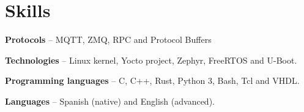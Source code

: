 \section{Skills}
\begin{small}
	\parbox[t][][t]{\linewidth}{
		\textbf{Protocols} -- {MQTT, ZMQ, RPC and Protocol Buffers}
		\bigbreak
	}
	\parbox[t][][t]{\linewidth}{
		\textbf{Technologies} -- {Linux kernel, Yocto project, Zephyr, FreeRTOS and U-Boot.}
		\bigbreak
	}
	\parbox[t][][t]{\linewidth}{
		\textbf{Programming languages} -- {C, C++, Rust, Python 3, Bash, Tcl and VHDL.}
		\bigbreak
	}
	\parbox[t][][t]{\linewidth}{
		\textbf{Languages} -- {Spanish (native) and English (advanced).}
		\bigbreak
	}
\end{small}
